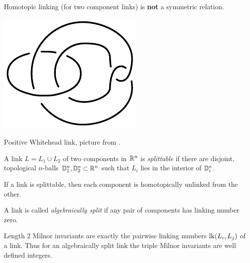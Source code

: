 \begin{remark}
	Homotopic linking (for two component links)
	is \textbf{not} a symmetric relation.
	\begin{marginfigure}
		\begin{center}
			\includegraphics[width=0.5\linewidth]{./pictures/positive_whitehead_link.pdf}
		\end{center}
		\caption{Positive Whitehead link,
			picture from \citep{meier2015distinguishing}.}
		\label{fig:positive_whitehead_link}
	\end{marginfigure}
\end{remark}

\begin{definition}
	A link $L = L_{1} \cup L_{2}$ of two components in $\mathbb{R}^{n}$
	is \textit{splittable} 
	if there are disjoint, topological $n$-balls $\mathbb{D}^{n}_{1}, \mathbb{D}^{n}_{2} \subset \mathbb{R}^{n}$
	such that $L_{i}$ lies in the interior of $\mathbb{D}^{n}_{i}$.
\end{definition}

\begin{proposition}
	\label{prop:splittable_implies_homotopically_unlinked}
	If a link is splittable, then each component is homotopically
	unlinked from the other.
\end{proposition}

\begin{definition}
	A link is called \textit{algebraically split} 
	if any pair of components has linking number zero.
\end{definition}

\begin{remark}
	Length $2$ Milnor invariants are exactly the pairwise linking numbers
	$\operatorname{lk}(L_{i}, L_{j})$ of a link. Thus for an algebraically split link
	the triple Milnor invariants are well defined integers.
\end{remark}
	

